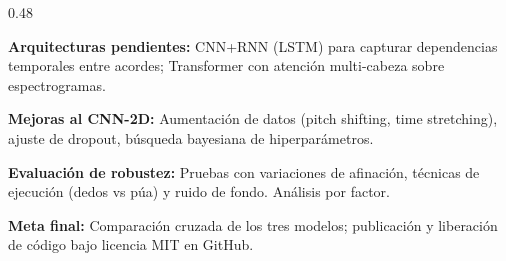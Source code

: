 \documentclass[final]{beamer}
\begin{document}
\begin{frame}[t]{}
\begin{columns}[t,totalwidth=\linewidth]
\begin{column}{0.48\linewidth}
\begin{tcolorbox}[sectionbox, title={$\Rightarrow$ Pr\'oximos Pasos}]
\begin{tcolorbox}[archbox, colback=traincolor!8, colframe=traincolor]
\textbf{\textcolor{traincolor}{Arquitecturas pendientes:}}
CNN+RNN (LSTM) para capturar dependencias temporales entre acordes; Transformer con atenci\'on multi-cabeza sobre espectrogramas.
\end{tcolorbox}
\vspace{4pt}
\begin{tcolorbox}[archbox, colback=accent!8, colframe=accent]
\textbf{\textcolor{accent}{Mejoras al CNN-2D:}}
Aumentaci\'on de datos (pitch shifting, time stretching), ajuste de dropout, b\'usqueda bayesiana de hiperpar\'ametros.
\end{tcolorbox}
\vspace{4pt}
\begin{tcolorbox}[archbox, colback=losscolor!8, colframe=losscolor]
\textbf{\textcolor{losscolor}{Evaluaci\'on de robustez:}}
Pruebas con variaciones de afinaci\'on, t\'ecnicas de ejecuci\'on (dedos vs p\'ua) y ruido de fondo. An\'alisis por factor.
\end{tcolorbox}
\vspace{4pt}
\begin{tcolorbox}[archbox, colback=accentgold!15, colframe=accentgold]
\textbf{\textcolor{accentgold!80!black}{Meta final:}}
Comparaci\'on cruzada de los tres modelos; publicaci\'on y liberaci\'on de c\'odigo bajo licencia MIT en GitHub.
\end{tcolorbox}
\end{tcolorbox}
\end{column}

\end{columns}

\vspace{6pt}


\end{frame}
\end{document}

